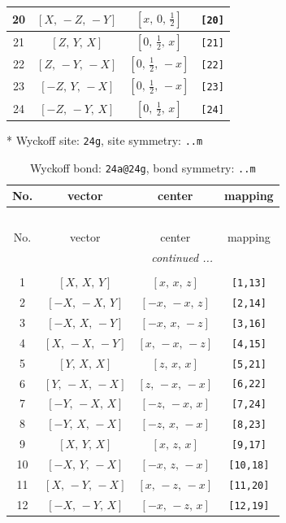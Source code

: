 \documentclass[fleqn,8pt]{jsarticle}
\begin{document}
\begin{longtable}{cccc}
20 & $\left[ X,\, - Z,\, - Y \right]$ & $\left[ x,\, 0,\, \frac{1}{2} \right]$ & {\tt [20]} \\ \hline
21 & $\left[ Z,\, Y,\, X \right]$ & $\left[ 0,\, \frac{1}{2},\, x \right]$ & {\tt [21]} \\ \hline
22 & $\left[ Z,\, - Y,\, - X \right]$ & $\left[ 0,\, \frac{1}{2},\, - x \right]$ & {\tt [22]} \\ \hline
23 & $\left[ - Z,\, Y,\, - X \right]$ & $\left[ 0,\, \frac{1}{2},\, - x \right]$ & {\tt [23]} \\ \hline
24 & $\left[ - Z,\, - Y,\, X \right]$ & $\left[ 0,\, \frac{1}{2},\, x \right]$ & {\tt [24]} \\
\end{longtable}
* Wyckoff site: {\tt 24g}, site symmetry: {\tt ..m}
\renewcommand{\arraystretch}{1.2}
\begin{longtable}{cccc}
\caption{Wyckoff bond: {\tt 24a@24g}, bond symmetry: {\tt ..m}}
 \\
 \hline \hline
No. & vector & center & mapping \\ \hline \endfirsthead

\multicolumn{3}{l}{\tablename\ \thetable{}} \\
 \hline \hline
No. & vector & center & mapping \\ \hline \endhead

 \hline \hline
\multicolumn{3}{r}{\footnotesize\it continued ...} \\ \endfoot

 \hline \hline
\multicolumn{3}{r}{} \\ \endlastfoot

1 & $\left[ X,\, X,\, Y \right]$ & $\left[ x,\, x,\, z \right]$ & {\tt [1,13]} \\ \hline
2 & $\left[ - X,\, - X,\, Y \right]$ & $\left[ - x,\, - x,\, z \right]$ & {\tt [2,14]} \\ \hline
3 & $\left[ - X,\, X,\, - Y \right]$ & $\left[ - x,\, x,\, - z \right]$ & {\tt [3,16]} \\ \hline
4 & $\left[ X,\, - X,\, - Y \right]$ & $\left[ x,\, - x,\, - z \right]$ & {\tt [4,15]} \\ \hline
5 & $\left[ Y,\, X,\, X \right]$ & $\left[ z,\, x,\, x \right]$ & {\tt [5,21]} \\ \hline
6 & $\left[ Y,\, - X,\, - X \right]$ & $\left[ z,\, - x,\, - x \right]$ & {\tt [6,22]} \\ \hline
7 & $\left[ - Y,\, - X,\, X \right]$ & $\left[ - z,\, - x,\, x \right]$ & {\tt [7,24]} \\ \hline
8 & $\left[ - Y,\, X,\, - X \right]$ & $\left[ - z,\, x,\, - x \right]$ & {\tt [8,23]} \\ \hline
9 & $\left[ X,\, Y,\, X \right]$ & $\left[ x,\, z,\, x \right]$ & {\tt [9,17]} \\ \hline
10 & $\left[ - X,\, Y,\, - X \right]$ & $\left[ - x,\, z,\, - x \right]$ & {\tt [10,18]} \\ \hline
11 & $\left[ X,\, - Y,\, - X \right]$ & $\left[ x,\, - z,\, - x \right]$ & {\tt [11,20]} \\ \hline
12 & $\left[ - X,\, - Y,\, X \right]$ & $\left[ - x,\, - z,\, x \right]$ & {\tt [12,19]} \\
\end{longtable}
\end{document}
